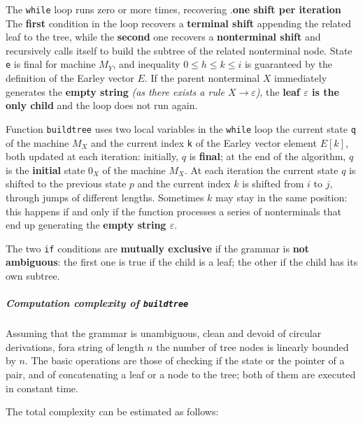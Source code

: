 \documentclass[english]{article}
\begin{document}
The \texttt{while} loop runs zero or more times, recovering .\textbf{one shift per iteration}
The \textbf{first} condition in the loop recovers a \textbf{terminal shift} appending the related leaf to the tree, while the \textbf{second} one recovers a \textbf{nonterminal shift} and recursively calls itself to build the subtree of the related nonterminal node.
State \texttt{e} is final for machine \(M_Y\), and inequality \(0 \leq h \leq k \leq i\) is guaranteed by the definition of the Earley vector \(E\).
If the parent nonterminal \(X\) immediately generates the \textbf{empty string} \textit{(as there exists a rule \(X \rightarrow \varepsilon\))}, the \textbf{leaf \(\varepsilon\) is the only child} and the loop does not run again.

Function \texttt{buildtree} uses two local variables in the \texttt{while} loop the current state \texttt{q} of the machine \(M_X\) and the current index \texttt{k} of the Earley vector element \(E[k]\), both updated at each iteration:
initially, \(q\) is \textbf{final}; at the end of the algorithm, \(q\) is the \textbf{initial} state \(0_X\) of the machine \(M_X\).
At each iteration the current state \(q\) is shifted to the previous state \(p\) and the current index \(k\) is shifted from \(i\) to \(j\), through jumps of different lengths.
Sometimes \(k\) may stay in the same position: this happens if and only if the function processes a series of nonterminals that end up generating the \textbf{empty string \(\varepsilon\)}.

The two \texttt{if} conditions are \textbf{mutually exclusive} if the grammar is \textbf{not ambiguous}:
the first one is true if the child is a leaf; the other if the child has its own subtree.

\subparagraph*{Computation complexity of \texttt{buildtree}}

Assuming that the grammar is unambiguous, clean and devoid of circular derivations, fora string of length \(n\) the number of tree nodes is linearly bounded by \(n\).
The basic operations are those of checking if the state or the pointer of a pair, and of concatenating a leaf or a node to the tree; both of them are executed in constant time.

The total complexity can be estimated as follows:
\end{document}

